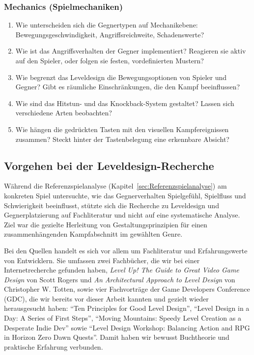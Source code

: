 \documentclass[../Main.tex]{subfiles}
\begin{document}
\subsubsection{Mechanics (Spielmechaniken)}

\begin{enumerate}[label=\textbf{M\arabic*}, leftmargin=1.5cm, itemsep=0.5em]
    \item Wie unterscheiden sich die Gegnertypen auf Mechanikebene: Bewegungsgeschwindigkeit, Angriffsreichweite, Schadenswerte?
    \item Wie ist das Angriffsverhalten der Gegner implementiert? Reagieren sie aktiv auf den Spieler, oder folgen sie festen, vordefinierten Mustern?
    \item Wie begrenzt das Leveldesign die Bewegungsoptionen von Spieler und Gegner? Gibt es räumliche Einschränkungen, die den Kampf beeinflussen?
    \item Wie sind das Hitstun- und das Knockback-System gestaltet? Lassen sich verschiedene Arten beobachten?
    \item Wie hängen die gedrückten Tasten mit den visuellen Kampfereignissen zusammen? Steckt hinter der Tastenbelegung eine erkennbare Absicht?
\end{enumerate}

\subsection{Vorgehen bei der Leveldesign-Recherche} \label{sec:VorgehenLeveldesign}
Während die Referenzspielanalyse (Kapitel~\ref{sec:Referenzspielanalyse}) am konkreten Spiel untersuchte, wie das Gegnerverhalten Spielgefühl, Spielfluss und Schwierigkeit beeinflusst, stützte sich die Recherche zu Leveldesign und Gegnerplatzierung auf Fachliteratur und nicht auf eine systematische Analyse. Ziel war die gezielte Herleitung von Gestaltungsprinzipien für einen zusammenhängenden Kampfabschnitt im gewählten Genre.

Bei den Quellen handelt es sich vor allem um Fachliteratur und Erfahrungswerte von Entwicklern. Sie umfassen zwei Fachbücher, die wir bei einer Internetrecherche gefunden haben, \textit{Level Up! The Guide to Great Video Game Design} von Scott Rogers\autocite{rogers2014levelup} und \textit{An Architectural Approach to Level Design} von Christopher W. Totten\autocite{totten2014architectural}, sowie vier Fachvorträge der Game Developers Conference (GDC), die wir bereits vor dieser Arbeit kannten und gezielt wieder herausgesucht haben: \enquote{Ten Principles for Good Level Design}\autocite{gdc_tenprinciples2010}, \enquote{Level Design in a Day: A Series of First Steps}\autocite{gdc_leveldesignaday2020}, \enquote{Moving Mountains: Speedy Level Creation as a Desperate Indie Dev}\autocite{gdc_movingmountains2020} sowie \enquote{Level Design Workshop: Balancing Action and RPG in Horizon Zero Dawn Quests}\autocite{gdc_horizonquests2018}. Damit haben wir bewusst Buchtheorie und praktische Erfahrung verbunden.
\end{document}
